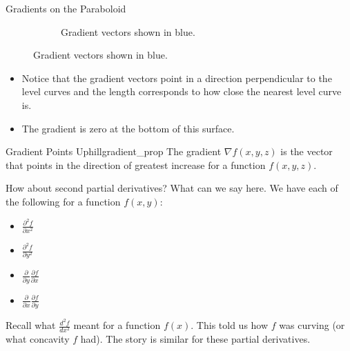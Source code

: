 \begin{ex}{Gradients on the Paraboloid}
\begin{figure}[H]
\begin{subfigure}[h]{.45\textwidth}
                            \caption{Gradient vectors shown in blue.}
                            \end{subfigure}
                        \end{figure}
                        \begin{itemize}
                            \item Notice that the gradient vectors point in a direction perpendicular to the level curves and the length corresponds to how close the nearest level curve is.
                            \item The gradient is zero at the bottom of this surface.  
                        \end{itemize}
                        \end{ex}
                        
                        \begin{prop}{Gradient Points Uphill}{gradient_prop}
                        The gradient $\nabla f(x,y,z)$ is the vector that points in the direction of greatest increase for a function $f(x,y,z)$.
                        \end{prop}
                        
                        How about second partial derivatives? What can we say here. We have each of the following for a function $f(x,y)$:
                        \begin{itemize}
                            \item $\frac{\partial^2 f}{\partial x^2}$
                            \item $\frac{\partial^2 f}{\partial y^2}$
                            \item $\frac{\partial}{\partial y}\frac{\partial f}{\partial x}$
                            \item $\frac{\partial}{\partial x}\frac{\partial f}{\partial y}$
                        \end{itemize}
                        
                        Recall what $\frac{d^2 f}{dx^2}$ meant for a function $f(x)$.  This told us how $f$ was curving (or what concavity $f$ had). The story is similar for these partial derivatives.
                        
